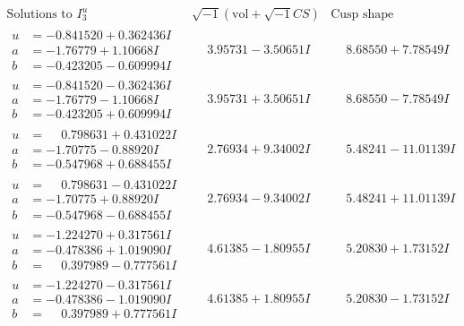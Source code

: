 \documentclass[1p]{elsarticle_modified}
\theoremstyle{definition}
\newcommand{\I}{\sqrt{-1}}
\begin{document}
$$\begin{array}{c|c|c}  
\text{Solutions to }I^u_{3}& \I (\text{vol} + \sqrt{-1}CS) & \text{Cusp shape}\\
 \hline 
\begin{aligned}
u &= -0.841520 + 0.362436 I \\
a &= -1.76779 + 1.10668 I \\
b &= -0.423205 - 0.609994 I\end{aligned}
 & \phantom{-}3.95731 - 3.50651 I & \phantom{-}8.68550 + 7.78549 I \\ \hline\begin{aligned}
u &= -0.841520 - 0.362436 I \\
a &= -1.76779 - 1.10668 I \\
b &= -0.423205 + 0.609994 I\end{aligned}
 & \phantom{-}3.95731 + 3.50651 I & \phantom{-}8.68550 - 7.78549 I \\ \hline\begin{aligned}
u &= \phantom{-}0.798631 + 0.431022 I \\
a &= -1.70775 - 0.88920 I \\
b &= -0.547968 + 0.688455 I\end{aligned}
 & \phantom{-}2.76934 + 9.34002 I & \phantom{-}5.48241 - 11.01139 I \\ \hline\begin{aligned}
u &= \phantom{-}0.798631 - 0.431022 I \\
a &= -1.70775 + 0.88920 I \\
b &= -0.547968 - 0.688455 I\end{aligned}
 & \phantom{-}2.76934 - 9.34002 I & \phantom{-}5.48241 + 11.01139 I \\ \hline\begin{aligned}
u &= -1.224270 + 0.317561 I \\
a &= -0.478386 + 1.019090 I \\
b &= \phantom{-}0.397989 - 0.777561 I\end{aligned}
 & \phantom{-}4.61385 - 1.80955 I & \phantom{-}5.20830 + 1.73152 I \\ \hline\begin{aligned}
u &= -1.224270 - 0.317561 I \\
a &= -0.478386 - 1.019090 I \\
b &= \phantom{-}0.397989 + 0.777561 I\end{aligned}
 & \phantom{-}4.61385 + 1.80955 I & \phantom{-}5.20830 - 1.73152 I \\ \hline\begin{aligned}

\end{aligned}
\end{array}$$
\end{document}
